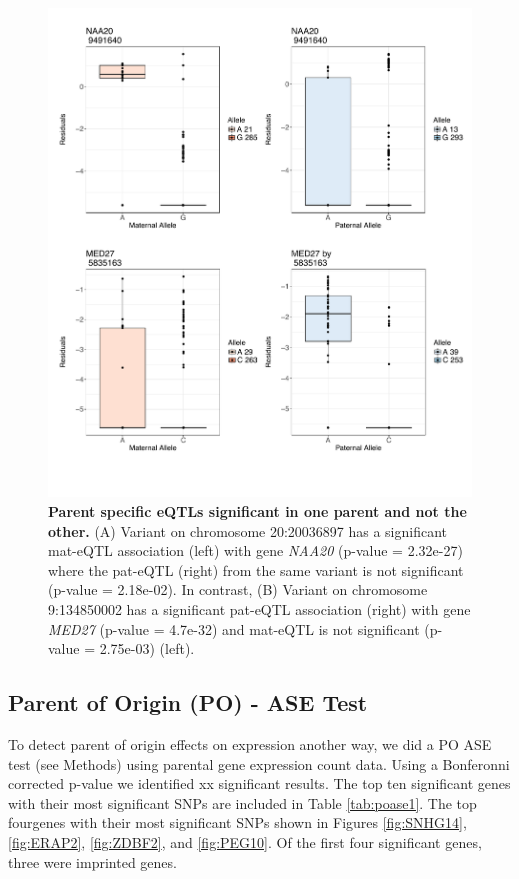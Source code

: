 \begin{figure}[!htb]
\centering \includegraphics[width=5in]{img/ch04/fig-07-sig_notsig.pdf}
\caption[Parent specific eQTLs significant in one parent and not the other]{\textbf{Parent specific eQTLs significant in one parent and not the other.} (A) Variant on chromosome 20:20036897 has a significant mat-eQTL association (left) with gene \emph{NAA20} (p-value = 2.32e-27) where the pat-eQTL (right) from the same variant is not significant (p-value = 2.18e-02). In contrast, (B) Variant on chromosome 9:134850002 has a significant pat-eQTL association (right) with gene \emph{MED27} (p-value = 4.7e-32) and mat-eQTL is not significant (p-value = 2.75e-03) (left).}
\label{fig:sig_notsig}
\end{figure}


\subsection{Parent of Origin (PO) - ASE Test}\label{Parent of Origin (PO) - ASE Test} 

To detect parent of origin effects on expression another way, we did a PO ASE test (see Methods) using parental gene expression count data. Using a Bonferonni corrected p-value we identified xx significant results. The top ten significant genes with their most significant SNPs are included in Table \ref{tab:poase1}. The top fourgenes with their most significant SNPs shown in Figures \ref{fig:SNHG14}, \ref{fig:ERAP2}, \ref{fig:ZDBF2}, and \ref{fig:PEG10}. Of the first four significant genes, three were imprinted genes.



